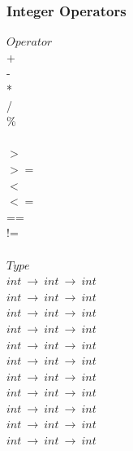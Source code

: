 \documentclass[5pt]{article}
\begin{document}
\subsubsection{Integer Operators}
\begin{multicols}{3}
\noindent $Operator$ \\
\hspace*{5mm} + \\
\hspace*{5mm} - \\
\hspace*{5mm} * \\
\hspace*{5mm} / \\
\hspace*{5mm} \% \\
\hspace*{5mm} \^ \\
\hspace*{5mm} $>$ \\
\hspace*{5mm} $>=$ \\
\hspace*{5mm} $<$ \\
\hspace*{5mm} $<=$ \\
\hspace*{5mm} == \\
\hspace*{5mm} != \\
\columnbreak \\
\noindent $Type$ \\
$int \ \rightarrow \ int \ \rightarrow \ int $ \\
$int \ \rightarrow \ int \ \rightarrow \ int $ \\
$int \ \rightarrow \ int \ \rightarrow \ int $ \\
$int \ \rightarrow \ int \ \rightarrow \ int $ \\
$int \ \rightarrow \ int \ \rightarrow \ int $ \\
$int \ \rightarrow \ int \ \rightarrow \ int $ \\
$int \ \rightarrow \ int \ \rightarrow \ int $ \\
$int \ \rightarrow \ int \ \rightarrow \ int $ \\
$int \ \rightarrow \ int \ \rightarrow \ int $ \\
$int \ \rightarrow \ int \ \rightarrow \ int $ \\
$int \ \rightarrow \ int \ \rightarrow \ int $ \\

\end{multicols}
\end{document}
